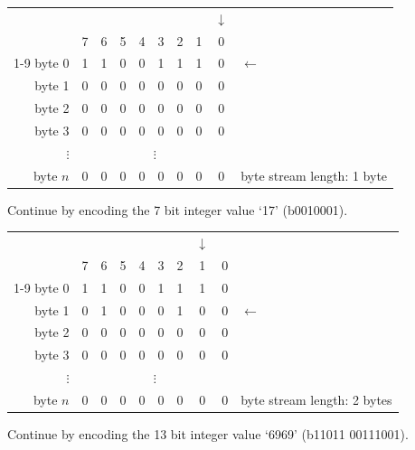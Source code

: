 \documentclass[11pt,letterpaper]{article}
\begin{document}
\begin{tabular}{rccccccccl}
                    &   &   &   &   &   &   &   &$\downarrow$&   \\
        \hfill\vline& 7 & 6 & 5 & 4 & 3 & 2 & 1 & 0 &            \\\cline{1-9}
byte 0  \hfill\vline& 1 & 1 & 0 & 0 & 1 & 1 & 1 & 0 &$\leftarrow$\\
byte 1  \hfill\vline& 0 & 0 & 0 & 0 & 0 & 0 & 0 & 0 &            \\
byte 2  \hfill\vline& 0 & 0 & 0 & 0 & 0 & 0 & 0 & 0 &            \\
byte 3  \hfill\vline& 0 & 0 & 0 & 0 & 0 & 0 & 0 & 0 &            \\
\hfill$\vdots$\hfill\vline&\multicolumn{8}{c}{$\vdots$}&         \\
byte $n$\hfill\vline& 0 & 0 & 0 & 0 & 0 & 0 & 0 & 0 &
byte stream length: 1 byte
\end{tabular}
\vspace{\baselineskip}

Continue by encoding the 7 bit integer value `17' (b0010001).

\begin{tabular}{rccccccccl}
                    &   &   &   &   &   &   &$\downarrow$&&      \\
        \hfill\vline& 7 & 6 & 5 & 4 & 3 & 2 & 1 & 0 &            \\\cline{1-9}
byte 0  \hfill\vline& 1 & 1 & 0 & 0 & 1 & 1 & 1 & 0 &            \\
byte 1  \hfill\vline& 0 & 1 & 0 & 0 & 0 & 1 & 0 & 0 &$\leftarrow$\\
byte 2  \hfill\vline& 0 & 0 & 0 & 0 & 0 & 0 & 0 & 0 &            \\
byte 3  \hfill\vline& 0 & 0 & 0 & 0 & 0 & 0 & 0 & 0 &            \\
\hfill$\vdots$\hfill\vline&\multicolumn{8}{c}{$\vdots$}&         \\
byte $n$\hfill\vline& 0 & 0 & 0 & 0 & 0 & 0 & 0 & 0 &
byte stream length: 2 bytes
\end{tabular}
\vspace{\baselineskip}

Continue by encoding the 13 bit integer value `6969' (b11011 00111001).
\end{document}
